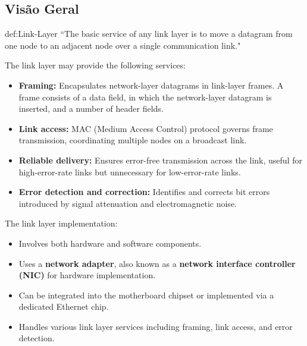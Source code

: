 \subsection[5.1 Visão Geral]{\hspace*{0.075 em}\raisebox{0.2 em}{$\pmb{\drsh}$} Visão Geral}
\label{subsec:visao-geral}

\begin{theo}{def:Link-Layer}\label{def:Link-Layer}
    ``The basic service of any link layer is to move a datagram from one node to an adjacent node over a single communication link."\cite{Kurose2017}
\end{theo}

\noindent The link layer may provide the following services:
\begin{itemize}
    \item \textbf{Framing:} Encapsulates network-layer datagrams in link-layer frames. A frame consists of a data field, in which the network-layer datagram is inserted, and a number of header fields.
    \item \textbf{Link access:} MAC (Medium Access Control) protocol governs frame transmission, coordinating multiple nodes on a broadcast link.
    \item \textbf{Reliable delivery:} Ensures error-free transmission across the link, useful for high-error-rate links but unnecessary for low-error-rate links.
    \item \textbf{Error detection and correction:} Identifies and corrects bit errors introduced by signal attenuation and electromagnetic noise.
\end{itemize}

\noindent The link layer implementation:
\begin{itemize}
    \item Involves both hardware and software components.
    \item Uses a \textbf{network adapter}, also known as a \textbf{network interface controller (NIC)} for hardware implementation.
    \item Can be integrated into the motherboard chipset or implemented via a dedicated Ethernet chip.
    \item Handles various link layer services including framing, link access, and error detection.
\end{itemize}

